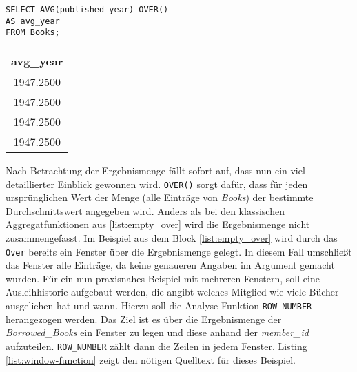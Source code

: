 \begin{minipage}{0.60\textwidth}
	 \begin{lstlisting}
SELECT AVG(published_year) OVER()
AS avg_year
FROM Books;
	\end{lstlisting}
\end{minipage}
\hfill
\begin{minipage}{0.45\textwidth}
	\centering
	\begin{tabular}{|c|}
		\hline
		\textbf{avg\_year} \\
		\hline
		1947.2500          \\
		\hline
		1947.2500          \\
		\hline
		1947.2500          \\
		\hline
		1947.2500          \\
		\hline
	\end{tabular}
	 \label{tab:ergebnis_over}
\end{minipage}

Nach Betrachtung der Ergebnismenge fällt sofort auf, dass nun ein viel
detaillierter Einblick gewonnen wird. \texttt{OVER()} sorgt dafür, dass für jeden
ursprünglichen Wert der Menge (alle Einträge von \textit{Books}) der bestimmte
Durchschnittswert angegeben wird. Anders als bei den klassischen Aggregatfunktionen
aus \ref{list:empty_over} wird die Ergebnismenge nicht zusammengefasst. Im
Beispiel aus dem Block \ref{list:empty_over} wird durch das \texttt{Over} bereits
ein Fenster über die Ergebnismenge gelegt. In diesem Fall umschließt das Fenster
alle Einträge, da keine genaueren Angaben im Argument gemacht wurden. Für ein
nun praxisnahes Beispiel mit mehreren Fenstern, soll eine Ausleihhistorie aufgebaut
werden, die angibt welches Mitglied wie viele Bücher ausgeliehen hat und wann. Hierzu
soll die Analyse-Funktion \texttt{ROW\_NUMBER} herangezogen werden. Das Ziel ist
es über die Ergebnismenge der \textit{Borrowed\_Books} ein Fenster zu legen und
diese anhand der \textit{member\_id} aufzuteilen. \texttt{ROW\_NUMBER} zählt dann
die Zeilen in jedem Fenster. Listing \ref{list:window-function} zeigt den
nötigen Quelltext für dieses Beispiel.

